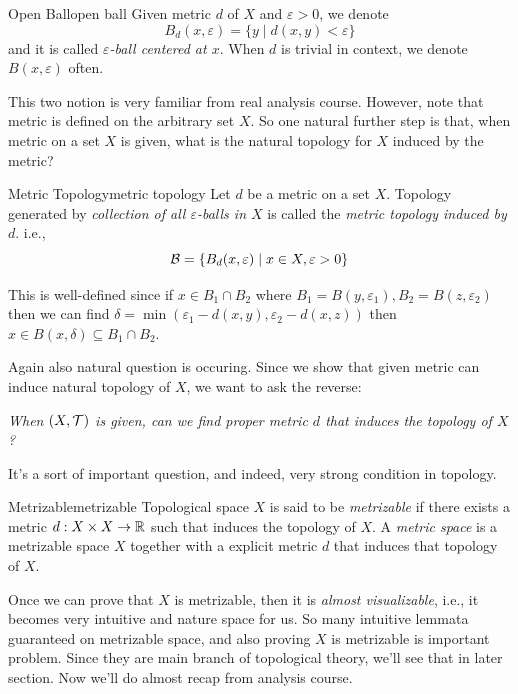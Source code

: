 \documentclass[12pt, a4paper, twoside]{article}
\theoremstyle{plain}
\begin{document}
\begin{notn}{Open Ball}{open ball}
    Given metric $d$ of $X$ and $\varepsilon > 0$, we denote 
    \[B_d(x, \varepsilon) = \{y \mid d(x, y) < \varepsilon\}\]
    and it is called \textit{$\varepsilon$-ball centered at $x$}. When $d$ is trivial in context, we denote $B(x, \varepsilon)$ often. 
\end{notn}

This two notion is very familiar from real analysis course. However, note that metric is 
defined on the arbitrary set $X$. So one natural further step is that, 
when metric on a set $X$ is given, what is the natural topology for $X$ induced by the metric? 

\begin{defn}{Metric Topology}{metric topology}
    Let $d$ be a metric on a set $X$. Topology generated by \textit{collection of all $\varepsilon$-balls in $X$} is called the \textit{metric topology induced by $d$}. 
    i.e., 
    \[{\mathcal {B}} = \{B_d(x, \varepsilon) \mid x \in X, \varepsilon > 0\}\]
\end{defn}

This is well-defined since if $x \in B_1 \cap B_2$ where $B_1 = B(y, \varepsilon_1), B_2 = B(z, \varepsilon_2)$ then 
we can find $\delta = \min \left(\varepsilon_1 - d(x, y), \varepsilon_2 - d(x, z)\right)$ then $x \in B(x, \delta) \subseteq B_1 \cap B_2$. 

Again also natural question is occuring. Since we show that given metric can induce natural topology of $X$, 
we want to ask the reverse: 
\begin{center}
    \textit{When $(X, {\mathcal {T}})$ is given, can we find proper metric $d$ that induces the topology of $X$?}
\end{center}
It's a sort of important question, and indeed, very strong condition in topology. 
\begin{defn}{Metrizable}{metrizable}
    Topological space $X$ is said to be \textit{metrizable} if there exists a metric $d: X \times X \rightarrow {\mathbb {R}}$ such that 
    induces the topology of $X$. A \textit{metric space} is a metrizable space $X$ together with a explicit metric $d$ that induces that topology of $X$.  
\end{defn}
Once we can prove that $X$ is metrizable, then it is \textit{almost visualizable}, i.e., it becomes 
very intuitive and nature space for us. So many intuitive lemmata guaranteed on metrizable space, 
and also proving $X$ is metrizable is important problem. Since they are main branch of topological theory, 
we'll see that in later section. 
Now we'll do almost recap from analysis course. 
\end{document}

